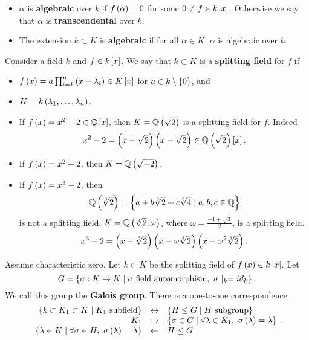 \begin{definition}
\hfill
\begin{itemize}
\item $ \alpha $ is \textbf{algebraic} over $ k $ if $ f\rb{\alpha} = 0 $ for some $ 0 \ne f \in k\sb{x} $. Otherwise we say that $ \alpha $ is \textbf{transcendental} over $ k $.
\item The extension $ k \subset K $ is \textbf{algebraic} if for all $ \alpha \in K $, $ \alpha $ is algebraic over $ k $.
\end{itemize}
\end{definition}

\begin{definition}
Consider a field $ k $ and $ f \in k\sb{x} $. We say that $ k \subset K $ is a \textbf{splitting field} for $ f $ if
\begin{itemize}
\item $ f\rb{x} = a\prod_{i = 1}^n \rb{x - \lambda_i} \in K\sb{x} $ for $ a \in k \setminus \cb{0} $, and
\item $ K = k\rb{\lambda_1, \dots, \lambda_n} $.
\end{itemize}

\end{definition}

\begin{example*}
\hfill
\begin{itemize}
\item If $ f\rb{x} = x^2 - 2 \in \Q\sb{x} $, then $ K = \Q\rb{\sqrt{2}} $ is a splitting field for $ f $. Indeed
$$ x^2 - 2 =\rb{x + \sqrt{2}}\rb{x - \sqrt{2}} \in \Q\rb{\sqrt{2}}\sb{x}. $$
\item If $ f\rb{x} = x^2 + 2 $, then $ K = \Q\rb{\sqrt{-2}} $.
\item If $ f\rb{x} = x^3 - 2 $, then
$$ \Q\rb{\sqrt[3]{2}} = \cb{a + b\sqrt[3]{2} + c\sqrt[3]{4} \mid a, b, c \in \Q} $$
is not a splitting field. $ K = \Q\rb{\sqrt[3]{2}, \omega} $, where $ \omega = \tfrac{-1 + \sqrt{3}}{2} $, is a splitting field.
$$ x^3 - 2 = \rb{x - \sqrt[3]{2}}\rb{x - \omega\sqrt[3]{2}}\rb{x - \omega^2\sqrt[3]{2}}. $$
\end{itemize}
\end{example*}

\pagebreak

\begin{theorem}
\label{thm:galoiscorrespondence}
Assume characteristic zero. Let $ k \subset K $ be the splitting field of $ f\rb{x} \in k\sb{x} $. Let
$$ G = \cb{\sigma : K \to K \mid \sigma \ \text{field automorphism}, \ \sigma\mid_{k} = id_k}. $$
We call this group the \textbf{Galois group}. There is a one-to-one correspondence
$$
\begin{array}{rcl}
\cb{k \subset K_1 \subset K \mid K_1 \ \text{subfield}} & \leftrightarrow & \cb{H \le G \mid H \ \text{subgroup}} \\
K_1 & \mapsto & \cb{\sigma \in G \mid \forall \lambda \in K_1, \ \sigma\rb{\lambda} = \lambda} \\
\cb{\lambda \in K \mid \forall \sigma \in H, \ \sigma\rb{\lambda} = \lambda} & \mapsfrom & H \le G
\end{array}.
$$
\end{theorem}

